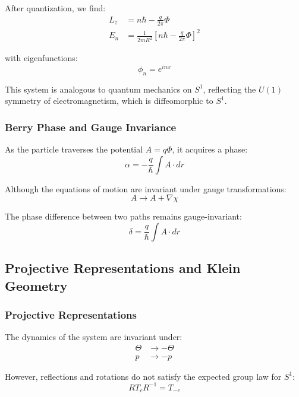 After quantization, we find:
\begin{align}
L_z &= n\hbar - \frac{q}{2\pi} \Phi \\
E_n &= \frac{1}{2mR^2} \left[ n\hbar - \frac{q}{2\pi} \Phi \right]^2
\end{align}

with eigenfunctions:
\begin{equation}
\phi_{n} = e^{inx}
\end{equation}

This system is analogous to quantum mechanics on $S^1$, reflecting the $U(1)$ symmetry of electromagnetism, which is diffeomorphic to $S^1$.

\subsubsection{Berry Phase and Gauge Invariance}

As the particle traverses the potential $A = q \Phi$, it acquires a phase:
\begin{equation}
\alpha = -\frac{q}{\hbar} \int A \cdot dr
\end{equation}

Although the equations of motion are invariant under gauge transformations:
\begin{equation}
A \to A + \nabla \chi
\end{equation}

The phase difference between two paths remains gauge-invariant:
\begin{equation}
\delta = \frac{q}{\hbar} \int A \cdot dr
\end{equation}

\subsection{Projective Representations and Klein Geometry}

\subsubsection{Projective Representations}

The dynamics of the system are invariant under:
\begin{align}
\Theta &\to -\Theta \\
p &\to -p
\end{align}

However, reflections and rotations do not satisfy the expected group law for $S^1$:
\begin{equation}
R T_{c} R^{-1} = T_{-c}
\end{equation}

